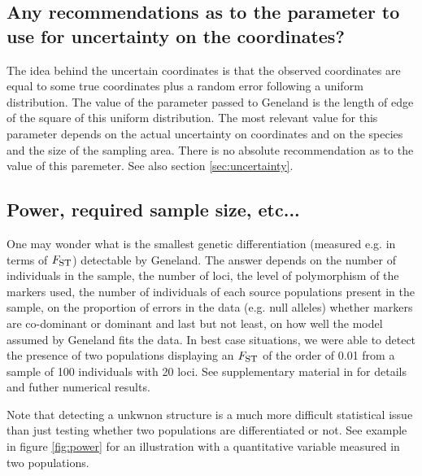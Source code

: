 \documentclass[a4paper,10pt]{article}
\newcommand{\Fst}{F_{\mbox{\footnotesize ST}}}
\begin{document}
\subsection[Parameter for uncertainty on coordinates]{Any recommendations as to the parameter to use for uncertainty on the coordinates?}\label{sec:faq_uncertainty}
The idea behind the uncertain coordinates is that the observed coordinates are equal 
to some true coordinates plus a random error following a uniform distribution. 
The value of the parameter passed to {\sc Geneland} is the length of edge of the square of this uniform distribution. 
The most relevant value for this parameter depends on the actual uncertainty on coordinates and on the 
species and the size of the sampling area. 
There is no absolute recommendation as to the value of this paremeter. See also section \ref{sec:uncertainty}. 


\subsection[Power]{Power, required sample size, etc...}
One may wonder what is the smallest genetic differentiation (measured e.g. in terms of $\Fst$) detectable by  {\sc Geneland}.
The answer depends on the number of individuals in the sample, the number of loci, the level of polymorphism of the markers used, 
the number of individuals of each source populations present in the sample, on the proportion of errors in the data (e.g. null alleles) 
whether markers are co-dominant or dominant and last but not least, on how well the model assumed by {\sc Geneland} fits the data.
In best case situations,  we were able to detect the presence of two populations displaying an $\Fst$ of the order of 0.01 
from a sample of 100 individuals with 20 loci. See supplementary material in \cite{Guillot08a} for details and futher numerical results. 

Note that detecting a unkwnon structure is a much more difficult statistical issue than just testing whether two populations 
are differentiated or not. See example in figure \ref{fig:power} for an illustration with a quantitative variable measured 
in two populations.
\end{document}
